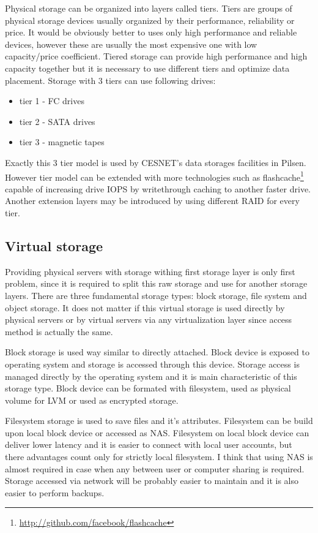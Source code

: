 Physical storage can be organized into layers called tiers. Tiers are groups of physical storage devices usually organized by their performance, reliability or price. It would be obviously better to uses only high performance and reliable devices, however these are usually the most expensive one with low capacity/price coefficient. Tiered storage can provide high performance and high capacity together but it is necessary to use different tiers and optimize data placement. Storage with 3 tiers can use following drives:
\begin{itemize}
	\item tier 1 - \Ac{FC} drives
	\item tier 2 - \Ac{SATA} drives
	\item tier 3 - magnetic tapes
\end{itemize}
Exactly this 3 tier model is used by CESNET's data storages facilities in Pilsen. However tier model can be extended with more technologies such as flashcache\footnote{\url{http://github.com/facebook/flashcache}} capable of increasing drive \Ac{IOPS} by writethrough caching to another faster drive. Another extension layers may be introduced by using different \Ac{RAID} for every tier.


\subsection{Virtual storage}
Providing physical servers with storage withing first storage layer is only first problem, since it is required to split this raw storage and use for another storage layers. There are three fundamental storage types: block storage, file system and object storage. It does not matter if this virtual storage is used directly by physical servers or by virtual servers via any virtualization layer since access method is actually the same.

Block storage is used way similar to directly attached. Block device is exposed to operating system and storage is accessed through this device. Storage access is managed directly by the operating system and it is main characteristic of this storage type. Block device can be formated with filesystem, used as physical volume for \Ac{LVM} or used as encrypted storage.

Filesystem storage is used to save files and it's attributes. Filesystem can be build upon local block device or accessed as \Ac{NAS}. Filesystem on local block device can deliver lower latency and it is easier to connect with local user accounts, but there advantages count only for strictly local filesystem. I think that using \Ac{NAS} is almost required in case when any between user or computer sharing is required. Storage accessed via network will be probably easier to maintain and it is also easier to perform backups. 

